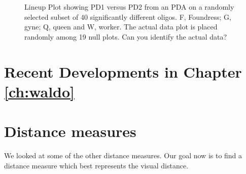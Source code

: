 \begin{figure}[hbtp]
   \centering
       \caption{Lineup Plot showing PD1 versus PD2 from an PDA on a randomly selected subset of 40 significantly different oligos. F, Foundress; G, gyne; Q, queen and W, worker. The actual data plot is placed randomly among 19 null plots. Can you identify the actual data?  }
       \label{toth_pda}
\end{figure}   


\section{Recent Developments in Chapter \ref{ch:waldo}}

\section{Distance measures}

We looked at some of the other distance measures. Our goal now is to find a distance measure which best represents the visual distance.


